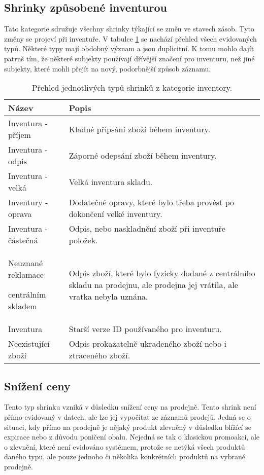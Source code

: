 \subsection*{Shrinky způsobené inventurou}
Tato kategorie sdružuje všechny shrinky týkající se změn ve stavech zásob. Tyto změny se projeví při inventuře. V tabulce \ref*{tab:sh:inv} se nachází přehled všech evidovaných typů. Některé typy mají obdobný význam a jsou duplicitní. K tomu mohlo dajít patrnš tím, že některé subjekty používají dřívější značení pro inventuru, než jiné subjekty, které mohli přejít na nový, podorbnější způsob záznamu. 

\begin{table}[hbtp!]
    \caption{Přehled jednotlivých typů shrinků z kategorie inventory.}
    \label{tab:sh:inv}
    \begin{tabular}{ p{4cm} p{10.5cm}}
     Název             & Popis \\
    \hline
              Inventura - příjem           & Kladné připsání zboží během inventury.      \\
              Inventura - odpis           & Záporné odepsání zboží během inventury.      \\
              Inventura - velká             & Velká inventura skladu.     \\
              Inventury - oprava       & Dodatečné opravy, které bylo třeba provést po dokončení velké inventury.      \\
              Inventura - částečná    & Odpis, nebo naskladnění zboží při inventuře položek.      \\
              Neuznané reklamace \par centrálním skladem  \strut &  Odpis zboží, které bylo fyzicky dodané z centrálního skladu na prodejnu, ale prodejna jej vrátila, ale vratka nebyla uznána.     \\
              Inventura              & Starší verze ID používaného pro inventuru.\\
              Neexistující zboží     & Odpis prokazatelně ukradeného zboží nebo i ztraceného zboží.      \\
    \end{tabular}
\end{table}


\subsection*{Snížení ceny}
 
Tento typ shrinku vzniká v důsledku snížení ceny na prodejně. Tento shrink není přímo evidovaný v datech, ale lze jej vypočítat ze záznamů prodejů. Jedná se o situaci, kdy přímo na prodejně je nějaký produkt zlevněný v důsledku blížící se expirace nebo z důvodu poničení obalu. Nejedná se tak o klasickou promoakci, ale o zlevnění, které není evidováno systémem, protože se netýká všech produktů daného typu, ale pouze jednoho či několika konkrétních produktů na vybrané prodejně.

